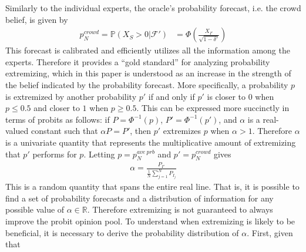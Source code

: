 \documentclass[11pt]{article}
\renewcommand{\P}{\mathbb{P}}
\theoremstyle{definition}
\theoremstyle{definition}
\begin{document}
Similarly to the individual experts, the oracle's probability forecast, i.e. the crowd belief, is given by 
 \begin{align*}
p^{crowd}_N = \P(X_S > 0 |  \mathcal{F}') &= \Phi\left( \frac{X_{I'}}{\sqrt{1-\delta'}} \right)
\end{align*}
This forecast is calibrated and efficiently utilizes all the information among the experts. Therefore it provides a ``gold standard'' for analyzing probability extremizing, which in this paper  is understood as an increase in the strength of the belief indicated by the probability forecast. More specifically, a probability $p$ is extremized by another probability $p'$ if and only if $p'$ is closer to $0$ when $p \leq 0.5$ and closer to $1$ when $p \geq 0.5$. This can be expressed more succinctly in terms of probits as follows: if $P = \Phi^{-1}(p)$, $P' = \Phi^{-1}(p')$, and $\alpha$ is a real-valued constant such that $\alpha P = P'$, then $p'$ extremizes $p$ when $\alpha > 1$. Therefore $\alpha$ is a univariate quantity that represents the multiplicative amount of extremizing that $p'$ performs for $p$. Letting $p= p_{N}^{ave\ prb}$ and $p' = p_N^{crowd}$ gives
\begin{align}
\alpha  = \frac{P_{I'}}{\frac{1}{N}\sum_{j=1}^N P_{I_j}}\label{alpha}
\end{align}
This is a random quantity that spans the entire real line. That is, it is possible to find a set of probability forecasts and a distribution of information for any possible value of $\alpha \in \mathbb{R}$. Therefore extremizing is not guaranteed to always improve the probit opinion pool. To understand when extremizing is likely to be beneficial, it is necessary to derive the probability distribution of $\alpha$. First, given that 
\end{document}
